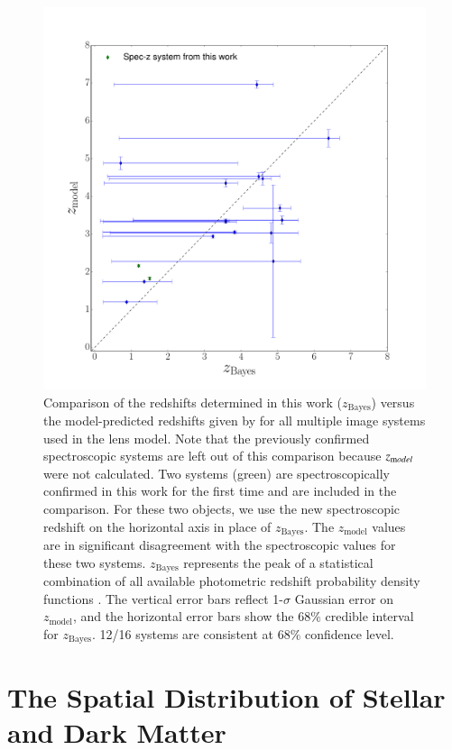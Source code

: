 \begin{figure}
    \centering
    \includegraphics[width=.8\textwidth]{fig/redshift_comparison.pdf}
    \caption[Comparison of the redshifts estimates.]{Comparison of the redshifts determined in this work
    ($z_{\textrm{Bayes}}$) versus the model-predicted redshifts given by \citet{2014arXiv1409.8663J} for all
    multiple image systems used in the lens model. Note that the previously confirmed spectroscopic systems are
    left out of this comparison because $z_{\textrm model}$ were not calculated. Two systems (green) are
    spectroscopically confirmed in this work for the first time and are included in the comparison. For these two
    objects, we use the new spectroscopic redshift on the horizontal axis in place of $z_{\textrm{Bayes}}$. The
    $z_{\textrm{model}}$ values are in significant disagreement with the spectroscopic values for these two
    systems. $z_{\textrm{Bayes}}$ represents the peak of a statistical combination of all available photometric
    redshift probability density functions \citep{Dahlen:2013p33380}. The vertical error bars reflect 1-$\sigma$
    Gaussian error on $z_{\textrm{model}}$, and the horizontal error bars show the $68\%$ credible interval for
    $z_{\textrm{Bayes}}$. 12/16 systems are consistent at $68\%$ confidence level. }
    \label{fig:compare_z}
\end{figure}


\section{The Spatial Distribution of Stellar and Dark Matter}

